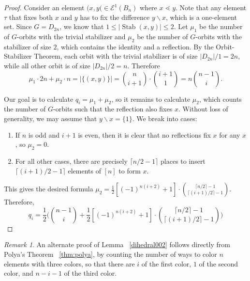 \documentclass[10 pt]{amsart}
\theoremstyle{plain}
\theoremstyle{definition}
\theoremstyle{remark}
\numberwithin{equation}{section}
\theoremstyle{remark}
\newtheorem{rem}[thm]{Remark}
\newcommand{\minus}{\backslash}
\newcommand{\dstyle}{\displaystyle}
\def\Stab{\operatorname{Stab}}
\begin{document}
\begin{proof}
Consider an element $(x , y( \in \mathcal E^1(B_n)$ where $x \lessdot y$. Note that any element $\tau $ that fixes both $x$ and $y$ has to fix the difference $y\minus x$, which is a one-element set. Since $G = D_{2n}$, %
we know that $1\leq |\Stab (x , y)| \leq 2$.  %
Let $\mu_1$ be the number of $G$-orbits with the trivial stabilizer and $\mu_2$ be the number of $G$-orbits with the stabilizer of size $2$, which contains the identity and a reflection. By the Orbit-Stabilizer Theorem, each orbit with the trivial stabilizer is of size $|D_{2n}| /1 = 2n $, while all other orbit is of size $|D_{2n}|/2 = n$.  Therefore $$\mu_1 \cdot 2n + \mu_2 \cdot n = |\{(x, y)\}| = {n \choose {i+1}}  \cdot {{i+1} \choose 1} = n {n-1 \choose i }.$$

Our goal is to calculate $q_i = \mu_1 + \mu_2$,
so it remains to calculate $\mu_2$, which counts the number of $G$-orbits such that the reflection also fixes $x$. Without loss of generality, we may assume that $y\minus x = \{1\}$. %
We break into cases:
\begin{enumerate}
\item If $n$ is odd and $i+1$ is even, then it is clear that no reflections fix $x$ for any $x$, so $\mu_2=0$. 
\item For all other cases, there are precisely $\lceil n/2 -1\rceil$ places to insert $\lceil (i+1)/2 - 1 \rceil$ elements of $[n]$ to form $x$. %
\end{enumerate}
This gives the desired formula $\dstyle \mu_2 =  \frac{1}{2} [(-1)^{n(i+2)}+1] \cdot { \lceil n/2\rceil -1  \choose \lceil (i+1)/2 \rceil - 1}   $. Therefore, 
$$q_i = \frac{1}{2} \Big( {n-1 \choose i } + \frac{1}{2} [(-1)^{n(i+2)}+1] \cdot { \lceil n/2\rceil -1  \choose \lceil (i+1)/2 \rceil - 1}    \Big)$$
\end{proof}
\begin{rem}
An alternate proof of Lemma ~\ref{dihedral002} follows directly from Polya's Theorem ~\ref{thm:polya}, by counting the number of ways to color $n$ elements with three colors, so that there are $i$ of the first color, $1$ of the second color, and $n-i-1$ of the third color.
\end{rem}
\end{document}
